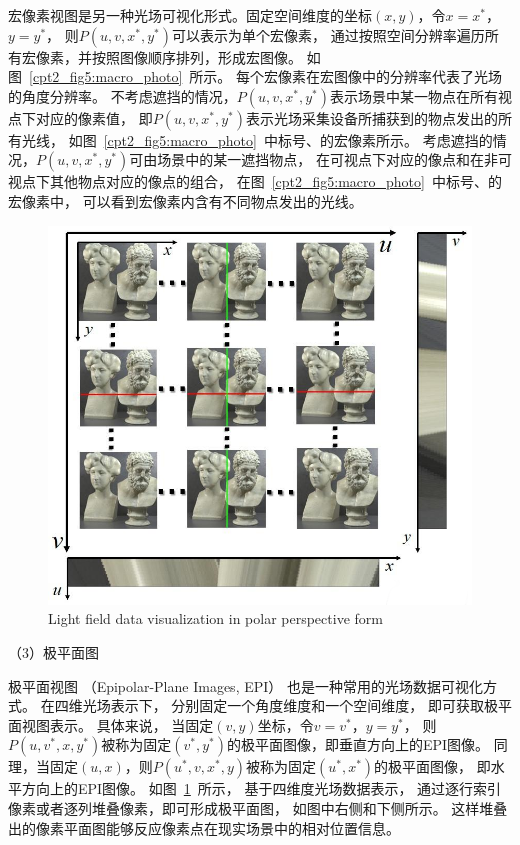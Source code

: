 宏像素视图是另一种光场可视化形式。固定空间维度的坐标$(x, y)$，令$x=x^{*}$，$y=y^{*}$，
则$ P(u, v, x^{*}, y^{*})$可以表示为单个宏像素，
通过按照空间分辨率遍历所有宏像素，并按照图像顺序排列，形成宏图像。
如图~\ref{cpt2_fig5:macro_photo}~所示。
每个宏像素在宏图像中的分辨率代表了光场的角度分辨率。
%
不考虑遮挡的情况，$ P(u, v, x^{*}, y^{*})$表示场景中某一物点在所有视点下对应的像素值，
即$ P(u, v, x^{*}, y^{*})$表示光场采集设备所捕获到的物点发出的所有光线，
如图~\ref{cpt2_fig5:macro_photo}~中标号、的宏像素所示。
考虑遮挡的情况，$ P(u, v, x^{*}, y^{*})$可由场景中的某一遮挡物点，
在可视点下对应的像点和在非可视点下其他物点对应的像点的组合，
在图~\ref{cpt2_fig5:macro_photo}~中标号、的宏像素中，
可以看到宏像素内含有不同物点发出的光线。\par
%
%
%
%
%
\begin{figure}[!ht]
	\centering
	\includegraphics[width=0.75\linewidth]{figures/chapter2/epi_photos}
	{Light field data visualization in polar perspective form}  
	\label{cpt2_fig6:epi_photos}
\end{figure}
%
%
%







（3）极平面图





极平面视图
（Epipolar-Plane Images, EPI）
也是一种常用的光场数据可视化方式。
在四维光场表示下，
分别固定一个角度维度和一个空间维度，
即可获取极平面视图表示。
具体来说，
当固定$(v, y)$坐标，令$v=v^{*}$，$y=y^{*}$，
则$ P(u, v^{*}, x, y^{*})$被称为固定$(v^{*}, y^{*})$的极平面图像，即垂直方向上的EPI图像。
同理，当固定$(u, x)$，则$ P(u^{*}, v, x^{*}, y)$被称为固定$(u^{*}, x^{*})$的极平面图像，
即水平方向上的EPI图像。
如图~\ref{cpt2_fig6:epi_photos}~所示，
基于四维度光场数据表示，
通过逐行索引像素或者逐列堆叠像素，即可形成极平面图，
如图中右侧和下侧所示。
这样堆叠出的像素平面图能够反应像素点在现实场景中的相对位置信息。








